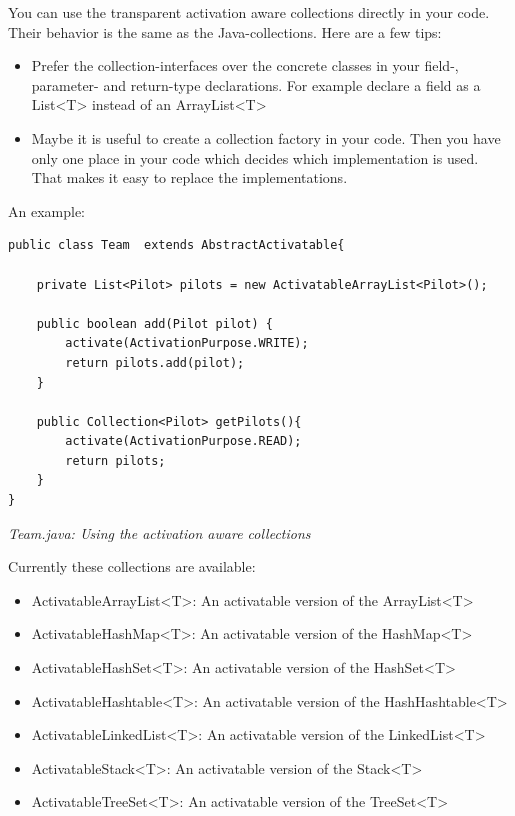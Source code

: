 You can use the transparent activation aware collections directly in your code. Their behavior is the same as the Java-collections. Here are a few tips:

\begin{itemize}
\item Prefer the collection-interfaces over the concrete classes in your field-, parameter- and return-type declarations. For example declare a field as a List\textless{}T\textgreater{} instead of an ArrayList\textless{}T\textgreater{}
\item Maybe it is useful to create a collection factory in your code. Then you have only one place in your code which decides which implementation is used. That makes it easy to replace the implementations.
\end{itemize}

An example:

\begin{lstlisting}
public class Team  extends AbstractActivatable{ 

    private List<Pilot> pilots = new ActivatableArrayList<Pilot>();

    public boolean add(Pilot pilot) {
        activate(ActivationPurpose.WRITE);
        return pilots.add(pilot);
    }

    public Collection<Pilot> getPilots(){
        activate(ActivationPurpose.READ);
        return pilots;
    }
}
\end{lstlisting}

{\small\itshape Team.java: Using the activation aware collections\par}
\medskip

Currently these collections are available:

\begin{itemize}
\item ActivatableArrayList\textless{}T\textgreater{}: An activatable version of the ArrayList\textless{}T\textgreater{}
\item ActivatableHashMap\textless{}T\textgreater{}: An activatable version of the HashMap\textless{}T\textgreater{}
\item ActivatableHashSet\textless{}T\textgreater{}: An activatable version of the HashSet\textless{}T\textgreater{}
\item ActivatableHashtable\textless{}T\textgreater{}: An activatable version of the HashHashtable\textless{}T\textgreater{}
\item ActivatableLinkedList\textless{}T\textgreater{}: An activatable version of the LinkedList\textless{}T\textgreater{}
\item ActivatableStack\textless{}T\textgreater{}: An activatable version of the Stack\textless{}T\textgreater{}
\item ActivatableTreeSet\textless{}T\textgreater{}: An activatable version of the TreeSet\textless{}T\textgreater{}
\end{itemize}

